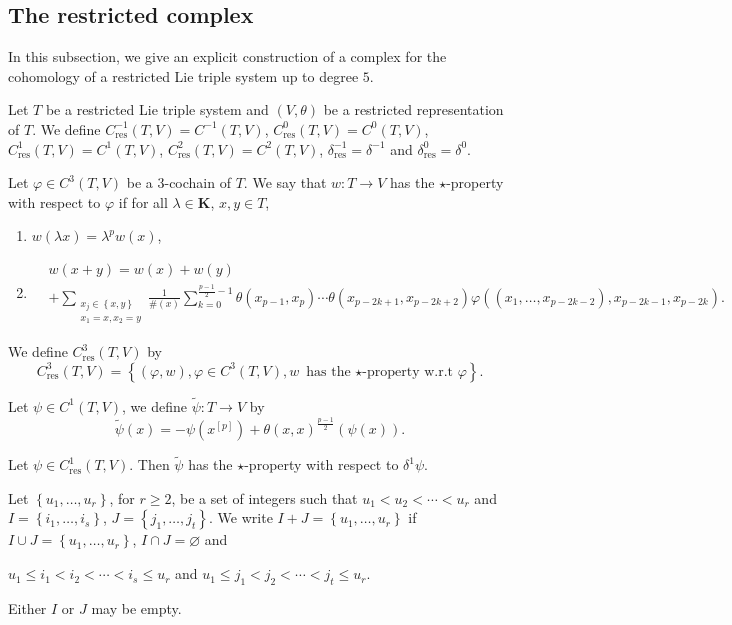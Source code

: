 \documentclass[11pt, twoside]{article}
\begin{document}
\subsection{The restricted complex}

In this subsection, we give an explicit construction of a complex for the cohomology of a restricted Lie triple system up to degree $5$. 

Let $T$ be a restricted Lie triple system and $(V,\theta) $ be a restricted representation of $T$. We define $C^{-1}_\mathrm{res}(T,V)= C^{-1}(T,V) $, $C^0_\mathrm{res}(T,V)=C^0(T,V) $, $C^1_\mathrm{res}(T,V)= C^1(T,V) $, $C^2_\mathrm{res}(T,V)=C^2(T,V) $, $\delta^{-1}_\mathrm{res}=\delta^{-1} $ and $\delta^0_\mathrm{res}=\delta^0$.

\begin{defi}
    Let $\varphi\in C^3(T,V)$ be a $3$-cochain of $T$. We say that $w:T\to V$ has the $\star $-property with respect to $\varphi$ if for all $\lambda\in \mathbf{K}$, $x,y\in T$, \begin{enumerate}
    \item $w(\lambda x)=\lambda^pw(x) $,
    \item \small{\begin{align*}
        &w(x+y)= w(x)+w(y) \\ &+  \sum_{\substack{x_j\in \left\{x,y \right\}\\x_1=x,x_2=y}}\frac{1}{\#(x)}\sum\limits_{k=0}^{\frac{p-1}{2}-1}\theta(x_{p-1},x_p)\cdots\theta(x_{p-2k+1},x_{p-2k+2}) \varphi((x_1,\ldots,x_{p-2k-2}),x_{p-2k-1},x_{p-2k}).
    \end{align*}}
\end{enumerate}
We define $C_{\mathrm{res}}^3(T,V) $ by $$C_{\mathrm{res}}^3(T,V)= \left\{(\varphi,w), \varphi\in C^3(T,V), w  \text{ has the  $\star$-property w.r.t}\, \varphi \right\}. $$
\end{defi}


Let $\psi\in C^1(T,V)$, we define $\tilde{\psi}:T\to V $ by $$\tilde{\psi}(x)=-\psi(x^{[p]})+\theta(x,x)^\frac{p-1}{2}(\psi(x)). $$ 

\begin{prop}\label{prop5.7}
    Let $\psi\in C^1_\mathrm{res}(T,V) $. Then $\tilde{\psi} $ has the $\star$-property with respect to $\delta^1\psi$.
\end{prop}



\begin{defi}
    Let $\left\{u_1,\ldots,u_r \right\} $, for $r\geq 2$, be a set of integers such that $u_1<u_2<\cdots<u_r $ and $I=\left\{i_1,\ldots,i_s \right\} $, $J= \left\{j_1,\ldots,j_t \right\} $. We write $I+J=\left\{u_1,\ldots,u_r \right\} $ if $I\cup J=\left\{u_1,\ldots,u_r\right\} $, $I\cap J=\varnothing$ and \begin{center}
        $u_1\leq i_1<i_2<\cdots<i_s\leq u_r $ and  $u_1\leq j_1<j_2<\cdots<j_t\leq u_r $.
    \end{center} Either $I$ or $J$ may be empty.
\end{defi} 
\end{document}
